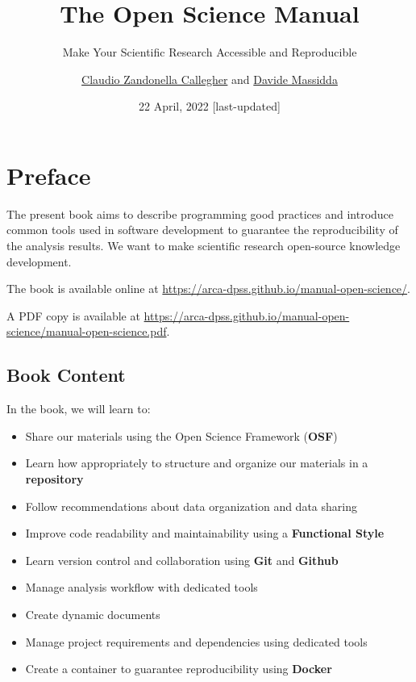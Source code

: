 \documentclass[
  11pt,
]{book}
\title{The Open Science Manual}
\subtitle{Make Your Scientific Research Accessible and Reproducible}
\author{\href{https://claudiozandonella.netlify.app/}{Claudio Zandonella Callegher} and
\href{https://www.linkedin.com/in/davidemassidda/}{Davide Massidda}}
\date{22 April, 2022 {[}last-updated{]}}
\providecommand{\tightlist}{%
  \setlength{\itemsep}{0pt}\setlength{\parskip}{0pt}}
\begin{document}
\maketitle

\pagestyle{empty}
\clearpage
\frontmatter
\pagestyle{plain}

{
\setcounter{tocdepth}{3}
\tableofcontents
}
\mainmatter
\pagestyle{myfancy}

\hypertarget{preface}{%
\chapter*{Preface}\label{preface}}

The present book aims to describe programming good practices and introduce common tools used in software development to guarantee the reproducibility of the analysis results. We want to make scientific research open-source knowledge development.

The book is available online at \url{https://arca-dpss.github.io/manual-open-science/}.

A PDF copy is available at \url{https://arca-dpss.github.io/manual-open-science/manual-open-science.pdf}.

\hypertarget{book-content}{%
\section*{Book Content}\label{book-content}}

In the book, we will learn to:

\begin{itemize}
\tightlist
\item
  Share our materials using the Open Science Framework (\textbf{OSF})
\item
  Learn how appropriately to structure and organize our materials in a \textbf{repository}
\item
  Follow recommendations about data organization and data sharing
\item
  Improve code readability and maintainability using a \textbf{Functional Style}
\item
  Learn version control and collaboration using \textbf{Git} and \textbf{Github}
\item
  Manage analysis workflow with dedicated tools
\item
  Create dynamic documents
\item
  Manage project requirements and dependencies using dedicated tools
\item
  Create a container to guarantee reproducibility using \textbf{Docker}
\end{itemize}
\end{document}

